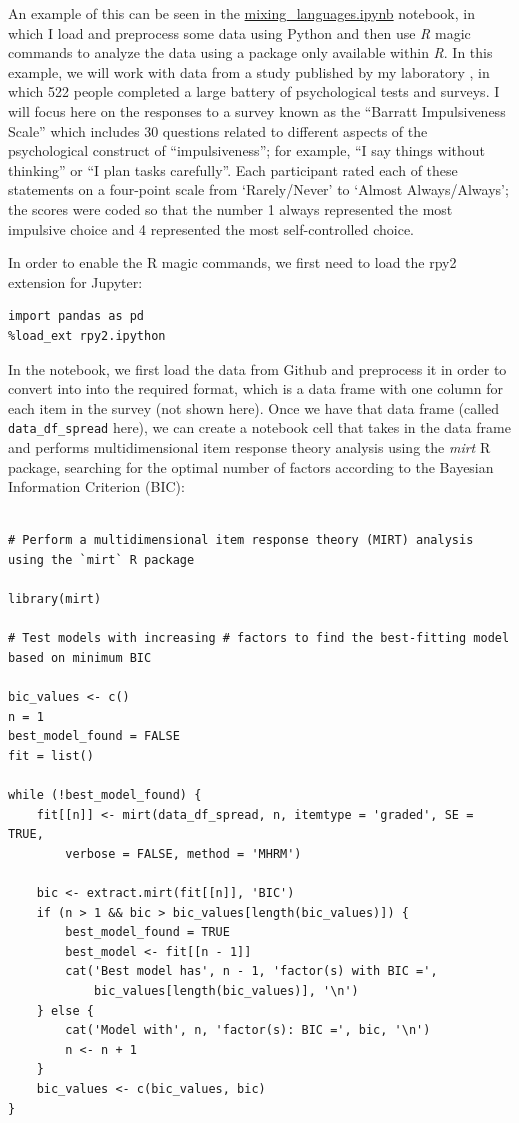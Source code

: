 An example of this can be seen in the \href{https://github.com/BetterCodeBetterScience/bettercode/blob/main/notebooks/mixing\_languages.ipynb}{mixing\_languages.ipynb} notebook, in which I load and preprocess some data using Python and then use \textit{R} magic commands to analyze the data using a package only available within \textit{R}.  In this example, we will work with data from a study published by my laboratory \citep{Eisenberg:2019aa}, in which 522 people completed a large battery of psychological tests and surveys.  I will focus here on the responses to a survey known as the ``Barratt Impulsiveness Scale'' which includes 30 questions related to different aspects of the psychological construct of ``impulsiveness''; for example, ``I say things without thinking'' or ``I plan tasks carefully''.  Each participant rated each of these statements on a four-point scale from `Rarely/Never' to `Almost Always/Always'; the scores were coded so that the number 1 always represented the most impulsive choice and 4 represented the most self-controlled choice.

In order to enable the R magic commands, we first need to load the rpy2 extension for Jupyter:

\begin{lstlisting}[style=Pythonshort]
import pandas as pd
%load_ext rpy2.ipython
\end{lstlisting}

In the notebook, we first load the data from Github and preprocess it in order to convert into into the required format, which is a data frame with one column for each item in the survey (not shown here). Once we have that data frame (called \texttt{data\_df\_spread} here), we can create a notebook cell that takes in the data frame and performs multidimensional item response theory analysis using the \textit{mirt} R package, searching for the optimal number of factors according to the Bayesian Information Criterion (BIC):

\begin{lstlisting}[style=R]
%%R -i data_df_spread -o bic_values

# Perform a multidimensional item response theory (MIRT) analysis using the `mirt` R package

library(mirt)

# Test models with increasing # factors to find the best-fitting model based on minimum BIC

bic_values <- c()
n = 1
best_model_found = FALSE
fit = list()

while (!best_model_found) {
    fit[[n]] <- mirt(data_df_spread, n, itemtype = 'graded', SE = TRUE, 
        verbose = FALSE, method = 'MHRM')

    bic <- extract.mirt(fit[[n]], 'BIC')
    if (n > 1 && bic > bic_values[length(bic_values)]) {
        best_model_found = TRUE
        best_model <- fit[[n - 1]]
        cat('Best model has', n - 1, 'factor(s) with BIC =', 
            bic_values[length(bic_values)], '\n')
    } else {
        cat('Model with', n, 'factor(s): BIC =', bic, '\n')
        n <- n + 1
    }
    bic_values <- c(bic_values, bic)
}
\end{lstlisting}

